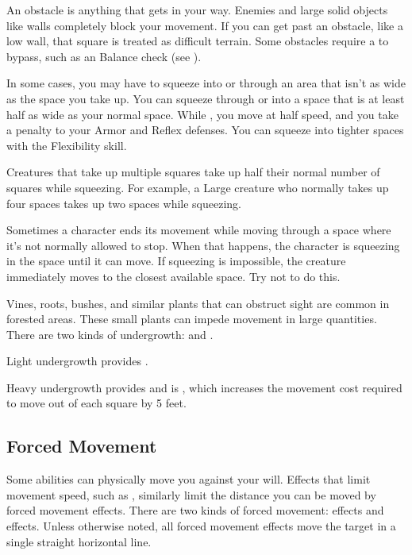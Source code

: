         An obstacle is anything that gets in your way. Enemies and large solid objects like walls completely block your movement. If you can get past an obstacle, like a low wall, that square is treated as difficult terrain. Some obstacles require a  to bypass, such as an Balance check (see ).

        \label{Squeezing}
        In some cases, you may have to squeeze into or through an area that isn't as wide as the space you take up.
        You can squeeze through or into a space that is at least half as wide as your normal space.
        While \squeezing, you move at half speed, and you take a  penalty to your Armor and Reflex defenses.
        You can squeeze into tighter spaces with the Flexibility skill.

        Creatures that take up multiple squares take up half their normal number of squares while squeezing. For example, a Large creature who normally takes up four spaces takes up two spaces while squeezing.

         Sometimes a character ends its movement while moving through a space where it's not normally allowed to stop. When that happens, the character is squeezing in the space until it can move. If squeezing is impossible, the creature immediately moves to the closest available space. Try not to do this.

        \label{Undergrowth} Vines, roots, bushes, and similar plants that can obstruct sight are common in forested areas.
        These small plants can impede movement in large quantities.
        There are two kinds of undergrowth:  and .

        \label{Light Undergrowth}
        Light undergrowth provides .

        \label{Heavy Undergrowth}
        Heavy undergrowth provides  and is , which increases the movement cost required to move out of each square by 5 feet.

    \subsection{Forced Movement}\label{Forced Movement}
        Some abilities can physically move you against your will.
        Effects that limit movement speed, such as , similarly limit the distance you can be moved by forced movement effects.
        There are two kinds of forced movement:  effects and  effects.
        Unless otherwise noted, all forced movement effects move the target in a single straight horizontal line.


